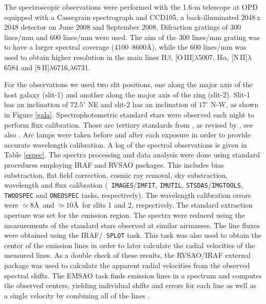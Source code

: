 \documentclass[useAMS,usenatbib]{mn2e}
\begin{document}
The spectroscopic observations were performed with the 1.6-m telescope at OPD
equipped with a Cassegrain spectrograph and CCD105, a back-illuminated
2048\,x\,2048 detector on June 2008 and September 2008. Difraction gratings of
300
lines/mm and 600 lines/mm were used. The aim of the 300 lines/mm grating was to
have a larger spectral coverage (4100--8600\AA), while the 600 lines/mm was
used to obtain higher resolution in the main lines H$\beta$,
[O\,III]$\lambda$5007,
H$\alpha$, [N\,II]$\lambda$6584 and [S\,II]$\lambda$6716,$\lambda$6731.

For the observations we used two slit positions, one along 
the major axis of the host galaxy (slit-1) and another along the major axis of
the ring (slit-2).
Slit-1 has an inclination of $72.5^\circ$ 
NE and slit-2 has an inclination of $17^\circ$ N-W, as shown in Figure
\ref{gala}. Spectrophotometric standard stars were observed each night to perform flux
calibration. Those are tertiary standards from \cite{1981PASP...93....5B}, as revised by 
\cite{1992PASP..104..533H}, see also 
\cite{1994PASP..106..566H}. Arc lamps were taken before and after each exposure in
order to provide accurate wavelength calibration. A log of the spectral
observations is given in Table \ref{espec}. The spectra processing and data
analysis were done using standard procedures employing IRAF and RVSAO
packages. This includes bias substraction, flat field correction, cosmic
ray removal, sky substraction, wavelength and flux calibration ({\tt
IMAGES}/{\tt IMFIT}, {\tt IMUTIL}, {\tt STSDAS}/{\tt IMGTOOLS}, {\tt TWODSPEC}
and {\tt ONEDSPEC} tasks, respectively). The wavelength calibration
errors were $\simeq 8$\AA\ and $\simeq 10$\AA\ for slits 1 and 2, respectively.
The standard extraction aperture was set for the
emission region. The spectra were reduced using the measurements of the
standard stars observed at
similar airmasses. The line fluxes were obtained using the IRAF/{\tt
SPLOT} task. This task was also used to obtain the center of the emission
lines in order to later calculate the radial velocities of the measured
lines. As a double check of these results, the RVSAO/IRAF external package
was used to calculate the apparent radial velocities from the observed
spectral shifts. The EMSAO task finds emission lines in a spectrum and
computes the observed centers, yielding individual shifts and errors for
each line as well as a single velocity by combining all of the lines
\citep{1995ASPC...77..496M}.
\end{document}
